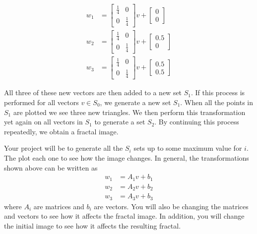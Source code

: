\documentclass{article}
\begin{document}
	\begin{align*}
		w_1 &= \begin{bmatrix}
			\frac{1}{4} & 0 \\ 0 & \frac{1}{4} \end{bmatrix}v + \begin{bmatrix} 0 \\ 0 \end{bmatrix} \\
			w_2 &= \begin{bmatrix}\frac{1}{4} & 0 \\ 0 & \frac{1}{4}  \end{bmatrix}v + \begin{bmatrix} 0.5 \\ 0 \end{bmatrix} \\
			w_3 &= \begin{bmatrix} \frac{1}{4} & 0 \\ 0 & \frac{1}{4} \end{bmatrix}v + \begin{bmatrix} 0.5 \\ 0.5 \end{bmatrix}
	\end{align*}
	
	All three of these new vectors are then added to a new set $S_1$.  If this process is performed for all vectors $v \in S_0$, we generate a new set $S_1$.  When all the points in $S_1$ are plotted we see three new triangles.  We then perform this transformation yet again on all vectors in $S_1$ to generate a set $S_2$.  By continuing this process repeatedly, we obtain a fractal image.
	
	Your project will be to generate all the $S_i$ sets up to some maximum value for $i$.  The plot each one to see how the image changes.  In general, the transformations shown above can be written as
	\begin{align*}
		w_1 &= A_1v + b_1 \\
		w_2 &= A_2v + b_2 \\
		w_3 &= A_3v + b_3 	
	\end{align*}
	where $A_i$ are matrices and $b_i$ are vectors.  You will also be changing the matrices and vectors to see how it affects the fractal image.  In addition, you will change the initial image to see how it affects the resulting fractal.


	
	
 
 	
\end{document}
